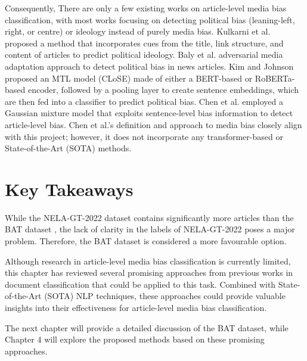 Consequently, There are only a few existing works on article-level media bias classification, with most works focusing on detecting political bias (leaning-left, right, or centre) or ideology instead of purely media bias. Kulkarni et al. \cite{kulkarni-2018-multi-view} proposed a method that incorporates cues from the title, link structure, and content of articles to predict political ideology. Baly et al. \cite{baly-2020-we-can-detect-your-bias} adversarial media adaptation approach to detect political bias in news articles. Kim and Johnson \cite{kim-johnson-2022-close} proposed an MTL model (CLoSE) made of either a BERT-based or RoBERTa-based encoder, followed by a pooling layer to create sentence embeddings, which are then fed into a classifier to predict political bias. Chen et al. \cite{chen-2020-detecting-media-bias-gaussian} employed a Gaussian mixture model that exploits sentence-level bias information to detect article-level bias. Chen et al.'s definition and approach to media bias closely align with this project; however, it does not incorporate any transformer-based or State-of-the-Art (SOTA) methods.

\section{Key Takeaways}

While the NELA-GT-2022 \cite{gruppi-2023-nela-gt-2022} dataset contains significantly more articles than the BAT dataset \cite{spinde-2023-bat}, the lack of clarity in the labels of NELA-GT-2022 poses a major problem. Therefore, the BAT dataset is considered a more favourable option.

Although research in article-level media bias classification is currently limited, this chapter has reviewed several promising approaches from previous works in document classification that could be applied to this task. Combined with State-of-the-Art (SOTA) NLP techniques, these approaches could provide valuable insights into their effectiveness for article-level media bias classification.

The next chapter will provide a detailed discussion of the BAT dataset, while Chapter 4 will explore the proposed methods based on these promising approaches.


